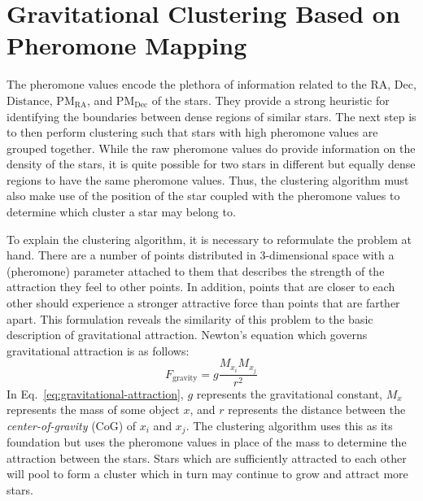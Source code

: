\newpage{}
\section{\label{sec:Clustering}Gravitational Clustering Based on Pheromone Mapping}

The pheromone values encode the plethora of information related to the $\text{RA}$, $\text{Dec}$, $\text{Distance}$, $\text{PM}_{\text{RA}}$, and $\text{PM}_{\text{Dec}}$ of the stars. They provide a strong heuristic for identifying the boundaries between dense regions of similar stars. The next step is to then perform clustering such that stars with high pheromone values are grouped together. While the raw pheromone values do provide information on the density of the stars, it is quite possible for two stars in different but equally dense regions to have the same pheromone values. Thus, the clustering algorithm must also make use of the position of the star coupled with the pheromone values to determine which cluster a star may belong to.

To explain the clustering algorithm, it is necessary to reformulate the problem at hand. There are a number of points distributed in 3-dimensional space with a (pheromone) parameter attached to them that describes the strength of the attraction they feel to other points. In addition, points that are closer to each other should experience a stronger attractive force than points that are farther apart. This formulation reveals the similarity of this problem to the basic description of gravitational attraction. Newton's equation which governs gravitational attraction is as follows:
\begin{equation}
    F_{\text{gravity}} = g\frac{M_{x_{i}}M_{x_{j}}}{r^{2}}\label{eq:gravitational-attraction}
\end{equation}
\indent{}In Eq.~\eqref{eq:gravitational-attraction}, $g$ represents the gravitational constant, $M_{x}$ represents the mass of some object $x$, and $r$ represents the distance between the \textit{center-of-gravity} (CoG) of $x_{i}$ and $x_{j}$. The clustering algorithm uses this as its foundation but uses the pheromone values in place of the mass to determine the attraction between the stars. Stars which are sufficiently attracted to each other will pool to form a cluster which in turn may continue to grow and attract more stars.

